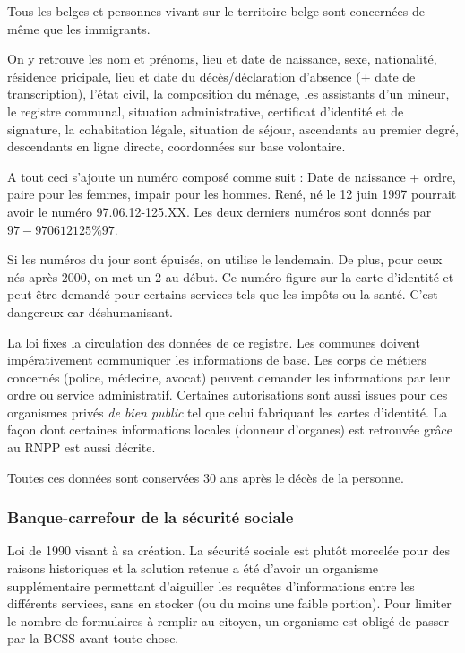 \documentclass[fleqn,letterpaper, 12pt]{article}
\begin{document}
	Tous les belges et personnes vivant sur le territoire belge sont concernées de même que les immigrants.
	
	On y retrouve les nom et prénoms, lieu et date de naissance, sexe, nationalité, résidence pricipale, lieu et date du décès/déclaration d'absence (+ date de transcription), l'état civil, la composition du ménage, les assistants d'un mineur, le registre communal, situation administrative, certificat d'identité et de signature, la cohabitation légale, situation de séjour, ascendants au premier degré, descendants en ligne directe, coordonnées sur base volontaire.
	
	A tout ceci s'ajoute un numéro composé comme suit : Date de naissance + ordre, paire pour les femmes, impair pour les hommes. René, né le 12 juin 1997 pourrait avoir le numéro 97.06.12-125.XX. Les deux derniers numéros sont donnés par $97 - 970612125\%97$.
	
	Si les numéros du jour sont épuisés, on utilise le lendemain. De plus, pour ceux nés après 2000, on met un 2 au début. Ce numéro figure sur la carte d'identité et peut être demandé pour certains services tels que les impôts ou la santé. C'est dangereux car déshumanisant.
	
	La loi fixes la circulation des données de ce registre. Les communes doivent impérativement communiquer les informations de base. Les corps de métiers concernés (police, médecine, avocat) peuvent demander les informations par leur ordre ou service administratif. Certaines autorisations sont aussi issues pour des organismes privés \emph{de bien public} tel que celui fabriquant les cartes d'identité. La façon dont certaines informations locales (donneur d'organes) est retrouvée grâce au RNPP est aussi décrite.
	
	Toutes ces données sont conservées 30 ans après le décès de la personne.
	
	
	\subsubsection{Banque-carrefour de la sécurité sociale}
	
	Loi de 1990 visant à sa création. La sécurité sociale est plutôt morcelée pour des raisons historiques et la solution retenue a été d'avoir un organisme supplémentaire permettant d'aiguiller les requêtes d'informations entre les différents services, sans en stocker (ou du moins une faible portion). Pour limiter le nombre de formulaires à remplir au citoyen, un organisme est obligé de passer par la BCSS avant toute chose.
	
\end{document}
